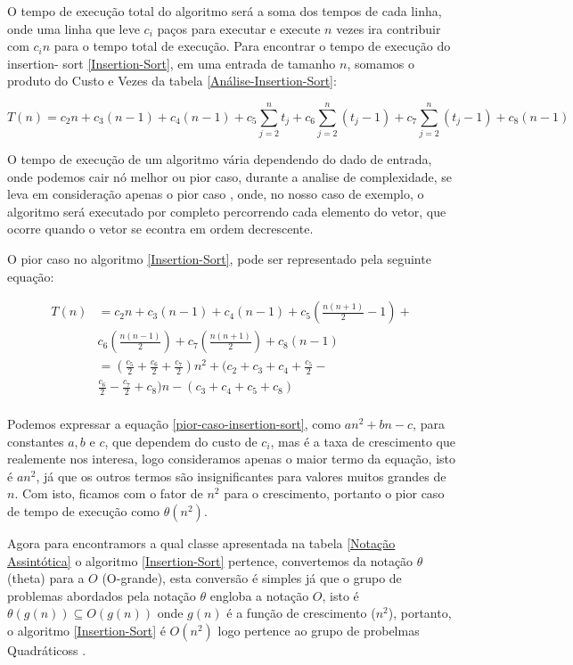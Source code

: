 \documentclass[
	12pt,				%
	openright,			%
	oneside,			%
	a4paper,			%
	english,			%
	brazil				%
	]{abntex2}
\begin{document}
O tempo de execução total do algoritmo será a soma dos tempos de cada linha, onde uma linha que leve $c_i$ paços para executar
e execute $n$ vezes ira contribuir com $c_in$ para o tempo total de execução. Para encontrar o tempo de execução do insertion-
sort \ref{Insertion-Sort}, em uma entrada de tamanho $n$, somamos o produto do Custo e Vezes da tabela \ref{Análise-Insertion-Sort}:

\begin{equation}
	\label{tempo-execução-insertion-sort}
	T(n) = c_2n + c_3(n - 1) + c_4(n - 1) + c_5\sum_{j=2}^{n} t_j + c_6\sum_{j=2}^{n} (t_j - 1) + c_7\sum_{j=2}^{n} (t_j - 1) + c_8(n-1)
\end{equation}

O tempo de execução de um algoritmo vária dependendo do dado de entrada, onde podemos cair nó melhor ou pior caso, durante a
analise de complexidade, se leva em consideração apenas o pior caso \cite{introductionAlgorthms}, onde, no nosso caso de exemplo, 
o algoritmo será executado por completo percorrendo cada elemento do vetor, que ocorre quando o vetor se econtra em ordem decrescente.

O pior caso no algoritmo \ref{Insertion-Sort}, pode ser representado pela seguinte equação:

\begin{equation}
	\label{pior-caso-insertion-sort}
	\begin{split}
		T(n)&= c_2n + c_3(n - 1) + c_4(n - 1) + c_5(\frac{n(n+1)}{2}-1) + \\ 
			&c_6(\frac{n(n-1)}{2}) + c_7(\frac{n(n+1)}{2}) + c_8(n-1) \\
			&= (\frac{c_5}{2} + \frac{c_6}{2} + \frac{c_7}{2})n^2 + (c_2 + c_3 + c_4 + \frac{c_5}{2} - \\
			&\frac{c_6}{2} - \frac{c_7}{2} + c_8)n - (c_3 + c_4 + c_5 + c_8) \\
	\end{split}
\end{equation}

Podemos expressar a equação \ref{pior-caso-insertion-sort}, como $an^2 + bn - c$, para constantes $a, b$ e $c$, que dependem do custo de
$c_i$, mas é a taxa de crescimento que realemente nos interesa, logo consideramos apenas o maior termo da equação, isto é $an^2$, já que
os outros termos são insignificantes para valores muitos grandes de $n$. Com isto, ficamos com o fator de $n^2$ para o crescimento, portanto
o pior caso de tempo de execução como $\theta(n^2)$.

Agora para encontramors a qual classe apresentada na tabela \ref{Notação Assintótica} o algoritmo \ref{Insertion-Sort} pertence, convertemos
da notação $\theta$ (theta) para a $O$ (O-grande), esta conversão é simples já que o grupo de problemas abordados pela notação $\theta$ engloba
a notação $O$, isto é $\theta(g(n)) \subseteq O(g(n))$ onde $g(n)$ é a função de crescimento ($n^2$), portanto, o algoritmo \ref{Insertion-Sort}
é $O(n^2)$ logo pertence ao grupo de probelmas Quadráticoss \cite{introductionAlgorthms}.
\end{document}
